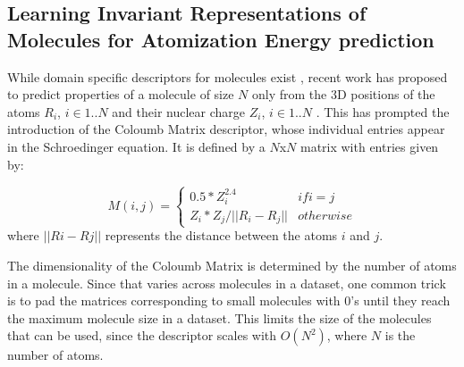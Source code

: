 \documentclass[10pt,journal,a4paper]{IEEEtran}
\begin{document}
%


\subsection{Learning Invariant Representations of Molecules for Atomization Energy prediction}

While domain specific descriptors for molecules exist \cite{todeschini2000handbook}, recent work \cite{initialcoloumb} has proposed to predict properties of a molecule of size $N$ only from the 3D positions of the atoms $R_i$, $i\in{1..N}$ and their nuclear charge $Z_i$, $i\in{1..N}$ . This has prompted the introduction of the Coloumb Matrix descriptor, whose individual entries appear in the Schroedinger equation. It is defined by a $N$x$N$ matrix with entries given by:

\begin{equation}
M(i,j) = \left\{
  \begin{array}{lr}
    0.5*Z_i^{2.4} & if i = j\\
    Z_i * Z_j / ||R_i - R_j|| & otherwise
  \end{array}
\right.
\end{equation}
where $||Ri - Rj||$ represents the distance between the atoms $i$ and $j$.

The dimensionality of the Coloumb Matrix is determined by the number of atoms in a molecule. Since that varies across molecules in a dataset, one common trick is to pad the matrices corresponding to small molecules with 0's until they reach the maximum molecule size in a dataset. This limits the size of the molecules that can be used, since the descriptor scales with $O(N^2)$, where $N$ is the number of atoms.
\end{document}
